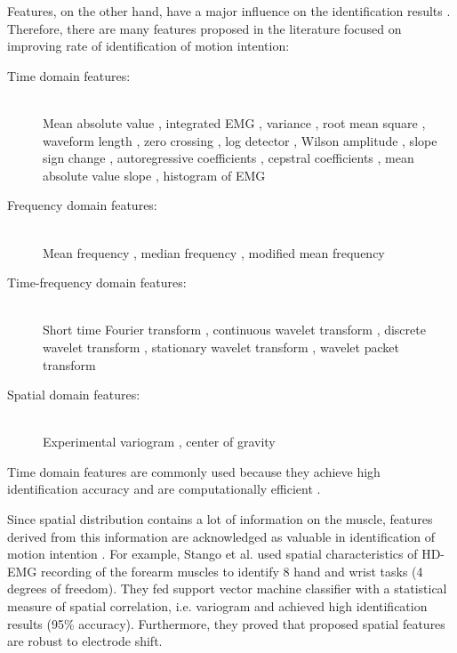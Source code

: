 Features, on the other hand, have a major influence on the identification results \citep{Englehart1999, Tkach2010}. Therefore, there are many features proposed in the literature focused on improving rate of identification of motion intention:

\begin{description}
\item[Time domain features:] \hfill \\
Mean absolute value \citep{Hudgins1993}, integrated EMG \citep{Park1998}, variance \citep{Park1998, Zardoshti1995}, root mean square \citep{Farrell2008}, waveform length \citep{Hudgins1993}, zero crossing \citep{Hudgins1993}, log detector \citep{Tkach2010}, Wilson amplitude \citep{Zardoshti1995}, slope sign change \citep{Hudgins1993}, autoregressive coefficients \citep{Hargrove2007}, cepstral coefficients \citep{Park1998}, mean absolute value slope \citep{Phinyomark2012}, histogram of EMG \citep{Phinyomark2012, Zardoshti1995}
\item[Frequency domain features:] \hfill \\
Mean frequency \citep{Phinyomark2012b}, median frequency \citep{Phinyomark2012b}, modified mean frequency \citep{Phinyomark2009}
\item[Time-frequency domain features:] \hfill \\
Short time Fourier transform \citep{Englehart2003b, Englehart2001}, continuous wavelet transform \citep{Englehart2003b, Englehart2001}, discrete wavelet transform \citep{Englehart2003b}, stationary wavelet transform \citep{Englehart2003b}, wavelet packet transform \citep{Englehart2003b, Englehart2001, Chu2006}
\item[Spatial domain features:] \hfill \\
Experimental variogram \citep{Stango2015}, center of gravity \citep{Rojas-Martinez2012, Rojas-Martinez2013}
\end{description}

Time domain features are commonly used because they achieve high identification accuracy and are computationally efficient \citep{Hakonen2015}.

Since spatial distribution contains a lot of information on the muscle, features derived from this information are acknowledged as valuable in identification of motion intention \citep{Stango2015, Hakonen2015, Rojas-Martinez2013}. For example, Stango et al. \citep{Stango2015} used spatial characteristics of HD-EMG recording of the forearm muscles to identify 8 hand and wrist tasks (4 degrees of freedom). They fed support vector machine classifier with a statistical measure of spatial correlation, i.e. variogram and achieved high identification results (95\% accuracy). Furthermore, they proved that proposed spatial features are robust to electrode shift.


